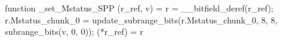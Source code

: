 function _set_Mstatus_SPP (r_ref, v) = {
    r = __bitfield_deref(r_ref);
    r.Mstatus_chunk_0 = update_subrange_bits(r.Mstatus_chunk_0, 8, 8, subrange_bits(v, 0, 0));
    (*r_ref) = r
}
